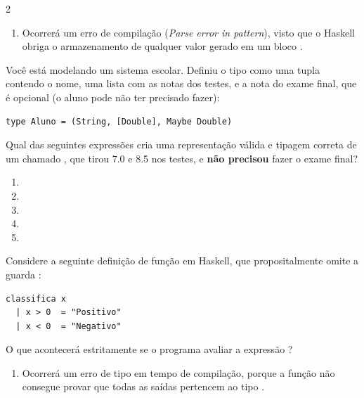 \documentclass[a4paper,10pt,brazil]{article}
\begin{document}
\begin{multicols}{2}
\begin{enumerate}
  \item Ocorrerá um erro de compilação (\emph{Parse error in pattern}), visto que o Haskell obriga o armazenamento de qualquer valor gerado em um bloco .


\end{enumerate}

Você está modelando um sistema escolar. Definiu o tipo  como uma tupla contendo o nome, uma lista com as notas dos testes, e a nota do exame final, que é opcional (o aluno pode não ter precisado fazer):
\begin{verbatim}
type Aluno = (String, [Double], Maybe Double)
\end{verbatim}

Qual das seguintes expressões cria uma representação válida e tipagem correta de um  chamado , que tirou 7.0 e 8.5 nos testes, e \textbf{não precisou} fazer o exame final?

\begin{enumerate}
  \item {}

  \item {}

  \item {}

  \item {}

  \item {}


\end{enumerate}

Considere a seguinte definição de função em Haskell, que propositalmente omite a guarda :

\begin{verbatim}
classifica x
  | x > 0  = "Positivo"
  | x < 0  = "Negativo"
\end{verbatim}

O que acontecerá estritamente se o programa avaliar a expressão ?

\begin{enumerate}
  \item Ocorrerá um erro de tipo em tempo de compilação, porque a função não consegue provar que todas as saídas pertencem ao tipo .


\end{enumerate}
\end{multicols}
\end{document}
